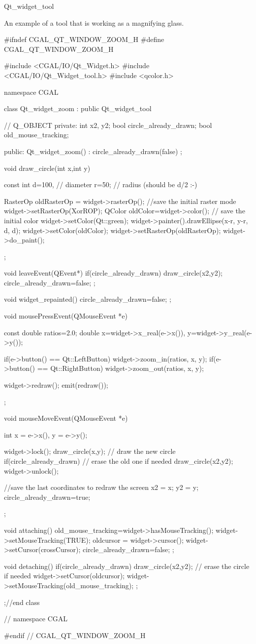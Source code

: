 \begin{ccRefClass}{Qt_widget_tool}
\ccExample

An example of a tool that is working as a magnifying glass.

\begin{ccExampleCode}
#ifndef CGAL_QT_WINDOW_ZOOM_H
#define CGAL_QT_WINDOW_ZOOM_H

#include <CGAL/IO/Qt_Widget.h>
#include <CGAL/IO/Qt_Widget_tool.h>
#include <qcolor.h>

namespace CGAL {

class Qt_widget_zoom : public Qt_widget_tool
{
  //  Q_OBJECT
private:
	int  x2, y2;
	bool circle_already_drawn;
	bool old_mouse_tracking;

public:
  Qt_widget_zoom() : circle_already_drawn(false) {};

  void draw_circle(int x,int y)
  {
    const int
    d=100, // diameter
    r=50;  // radius (should be d/2 :-)

    RasterOp oldRasterOp = widget->rasterOp();	//save the initial raster mode
    widget->setRasterOp(XorROP);
    QColor oldColor=widget->color(); // save the initial color
    widget->setColor(Qt::green);
    widget->painter().drawEllipse(x-r, y-r, d, d);
    widget->setColor(oldColor);
    widget->setRasterOp(oldRasterOp);
    widget->do_paint();
  };

  void leaveEvent(QEvent*)
  {
    if(circle_already_drawn)
      draw_circle(x2,y2);
    circle_already_drawn=false;
  };

  void widget_repainted(){
    circle_already_drawn=false;
  };

  void mousePressEvent(QMouseEvent *e)
  {
    const double ratios=2.0;
    double
      x=widget->x_real(e->x()),
      y=widget->y_real(e->y());
		
    if(e->button() == Qt::LeftButton)
      widget->zoom_in(ratios, x, y);
    if(e->button() == Qt::RightButton)
      widget->zoom_out(ratios, x, y);
		
    widget->redraw();
    emit(redraw()); 
  };

  void mouseMoveEvent(QMouseEvent *e)
  {
    int
      x = e->x(),
      y = e->y();

    widget->lock();
    draw_circle(x,y); // draw the new circle
    if(circle_already_drawn) // erase the old one if needed
        draw_circle(x2,y2);
    widget->unlock();
		
    //save the last coordinates to redraw the screen
    x2 = x;
    y2 = y;
    circle_already_drawn=true;
  };

  void attaching()
  {
    old_mouse_tracking=widget->hasMouseTracking();
    widget->setMouseTracking(TRUE);
    oldcursor = widget->cursor();
    widget->setCursor(crossCursor);
    circle_already_drawn=false;
  };

  void detaching()
  {
    if(circle_already_drawn)
      draw_circle(x2,y2); // erase the circle if needed
    widget->setCursor(oldcursor);
    widget->setMouseTracking(old_mouse_tracking);
  };
};//end class 

} // namespace CGAL

#endif // CGAL_QT_WINDOW_ZOOM_H
\end{ccExampleCode}

\end{ccRefClass}








